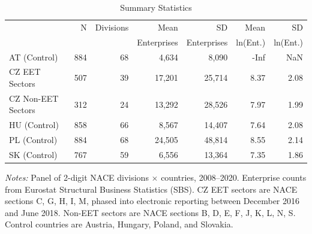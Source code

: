 \begin{table}[H]
\centering
\caption{Summary Statistics}
\begin{threeparttable}
\begin{tabular}{lrrrrrr}
\toprule
 & N & Divisions & Mean & SD & Mean & SD \\
 & & & Enterprises & Enterprises & ln(Ent.) & ln(Ent.) \\
\midrule
AT (Control) & 884 & 68 & 4,634 & 8,090 & -Inf & NaN \\
CZ EET Sectors & 507 & 39 & 17,201 & 25,714 & 8.37 & 2.08 \\
CZ Non-EET Sectors & 312 & 24 & 13,292 & 28,526 & 7.97 & 1.99 \\
HU (Control) & 858 & 66 & 8,567 & 14,407 & 7.64 & 2.08 \\
PL (Control) & 884 & 68 & 24,505 & 48,814 & 8.55 & 2.14 \\
SK (Control) & 767 & 59 & 6,556 & 13,364 & 7.35 & 1.86 \\
\bottomrule
\end{tabular}
\begin{tablenotes}[flushleft]
\small
\item \textit{Notes:} Panel of 2-digit NACE divisions $\times$ countries, 2008--2020. Enterprise counts from Eurostat Structural Business Statistics (SBS). CZ EET sectors are NACE sections C, G, H, I, M, phased into electronic reporting between December 2016 and June 2018. Non-EET sectors are NACE sections B, D, E, F, J, K, L, N, S. Control countries are Austria, Hungary, Poland, and Slovakia.
\end{tablenotes}
\end{threeparttable}
\label{tab:summary}
\end{table}

